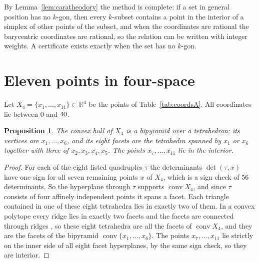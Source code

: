 \documentclass[aps,prd,twocolumn,superscriptaddress,nofootinbib,longbibliography,floatfix,showkeys,amsmath,amssymb,10pt]{revtex4-2}
\theoremstyle{plain}
\newtheorem{proposition}[theorem]{Proposition}
\theoremstyle{definition}
\theoremstyle{plain}
\newcommand{\R}{\mathbb{R}}
\newcommand{\conv}{\operatorname{conv}}
\begin{document}
By Lemma~\ref{lem:caratheodory} the method is complete: if a set in general position has no $k$-gon, then every $k$-subset contains a point in the interior of a simplex of other points of the subset, and when the coordinates are rational the barycentric coordinates are rational, so the relation can be written with integer weights. A certificate exists exactly when the set has no $k$-gon.

\section{Eleven points in four-space}\label{sec:A}

Let $X_4=\{x_1,\dots,x_{11}\}\subset\R^4$ be the points of Table~\ref{tab:coordsA}. All coordinates lie between $0$ and $40$.



\begin{proposition}\label{prop:structureA}
The convex hull of $X_4$ is a bipyramid over a tetrahedron: its vertices are $x_1,\dots,x_6$, and its eight facets are the tetrahedra spanned by $x_1$ or $x_6$ together with three of $x_2,x_3,x_4,x_5$. The points $x_7,\dots,x_{11}$ lie in the interior.
\end{proposition}

\begin{proof}
For each of the eight listed quadruples $\tau$ the determinants $\det(\tau,x)$ have one sign for all seven remaining points $x$ of $X_4$, which is a sign check of $56$ determinants. So the hyperplane through $\tau$ supports $\conv X_4$, and since $\tau$ consists of four affinely independent points it spans a facet. Each triangle contained in one of these eight tetrahedra lies in exactly two of them. In a convex polytope every ridge lies in exactly two facets and the facets are connected through ridges \cite{Zie95}, so these eight tetrahedra are all the facets of $\conv X_4$, and they are the facets of the bipyramid $\conv\{x_1,\dots,x_6\}$. The points $x_7,\dots,x_{11}$ lie strictly on the inner side of all eight facet hyperplanes, by the same sign check, so they are interior.
\end{proof}
\end{document}
